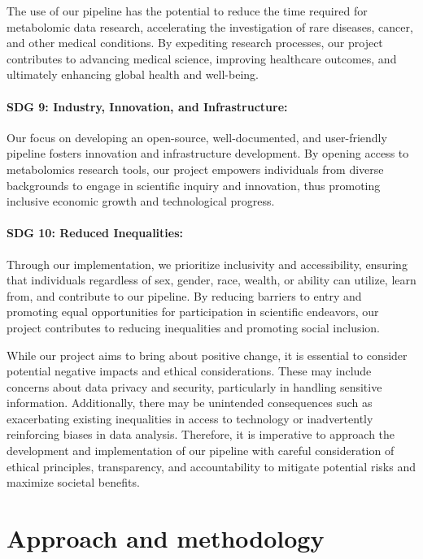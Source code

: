 \documentclass[ENG, BIB]{TFUOC}%
\begin{document}
The use of our pipeline has the potential to reduce the time required for metabolomic data research, accelerating the investigation of rare diseases, cancer, and other medical conditions. By expediting research processes, our project contributes to advancing medical science, improving healthcare outcomes, and ultimately enhancing global health and well-being.
 
\subsubsection{SDG 9: Industry, Innovation, and Infrastructure:} 
 
Our focus on developing an open-source, well-documented, and user-friendly pipeline fosters innovation and infrastructure development. By opening access to metabolomics research tools, our project empowers individuals from diverse backgrounds to engage in scientific inquiry and innovation, thus promoting inclusive economic growth and technological progress.
 
\subsubsection{SDG 10: Reduced Inequalities:} 

Through our implementation, we prioritize inclusivity and accessibility, ensuring that individuals regardless of sex, gender, race, wealth, or ability can utilize, learn from, and contribute to our pipeline. By reducing barriers to entry and promoting equal opportunities for participation in scientific endeavors, our project contributes to reducing inequalities and promoting social inclusion. 

\vspace{18pt}

While our project aims to bring about positive change, it is essential to consider potential negative impacts and ethical considerations. These may include concerns about data privacy and security, particularly in handling sensitive information. Additionally, there may be unintended consequences such as exacerbating existing inequalities in access to technology or inadvertently reinforcing biases in data analysis. Therefore, it is imperative to approach the development and implementation of our pipeline with careful consideration of ethical principles, transparency, and accountability to mitigate potential risks and maximize societal benefits.

\chapter{Approach and methodology}
\end{document}

